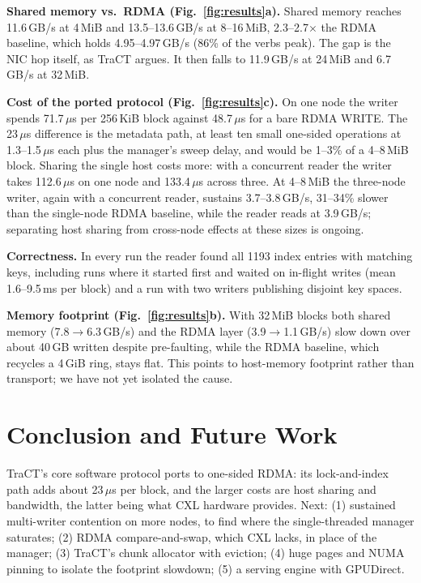 \documentclass[conference]{IEEEtran}
\begin{document}
\textbf{Shared memory vs.\ RDMA (Fig.~\ref{fig:results}a).} Shared memory reaches 11.6\,GB/s at 4\,MiB and 13.5--13.6\,GB/s at 8--16\,MiB, 2.3--2.7$\times$ the RDMA baseline, which holds 4.95--4.97\,GB/s (86\% of the verbs peak). The gap is the NIC hop itself, as TraCT argues. It then falls to 11.9\,GB/s at 24\,MiB and 6.7\,GB/s at 32\,MiB.

\textbf{Cost of the ported protocol (Fig.~\ref{fig:results}c).} On one node the writer spends 71.7\,$\mu$s per 256\,KiB block against 48.7\,$\mu$s for a bare RDMA WRITE. The 23\,$\mu$s difference is the metadata path, at least ten small one-sided operations at 1.3--1.5\,$\mu$s each plus the manager's sweep delay, and would be 1--3\% of a 4--8\,MiB block. Sharing the single host costs more: with a concurrent reader the writer takes 112.6\,$\mu$s on one node and 133.4\,$\mu$s across three. At 4--8\,MiB the three-node writer, again with a concurrent reader, sustains 3.7--3.8\,GB/s, 31--34\% slower than the single-node RDMA baseline, while the reader reads at 3.9\,GB/s; separating host sharing from cross-node effects at these sizes is ongoing.

\textbf{Correctness.} In every run the reader found all 1193 index entries with matching keys, including runs where it started first and waited on in-flight writes (mean 1.6--9.5\,ms per block) and a run with two writers publishing disjoint key spaces.

\textbf{Memory footprint (Fig.~\ref{fig:results}b).} With 32\,MiB blocks both shared memory (7.8$\rightarrow$6.3\,GB/s) and the RDMA layer (3.9$\rightarrow$1.1\,GB/s) slow down over about 40\,GB written despite pre-faulting, while the RDMA baseline, which recycles a 4\,GiB ring, stays flat. This points to host-memory footprint rather than transport; we have not yet isolated the cause.

\section{Conclusion and Future Work}
TraCT's core software protocol ports to one-sided RDMA: its lock-and-index path adds about 23\,$\mu$s per block, and the larger costs are host sharing and bandwidth, the latter being what CXL hardware provides. Next: (1) sustained multi-writer contention on more nodes, to find where the single-threaded manager saturates; (2) RDMA compare-and-swap, which CXL lacks, in place of the manager; (3) TraCT's chunk allocator with eviction; (4) huge pages and NUMA pinning to isolate the footprint slowdown; (5) a serving engine with GPUDirect.
\end{document}
